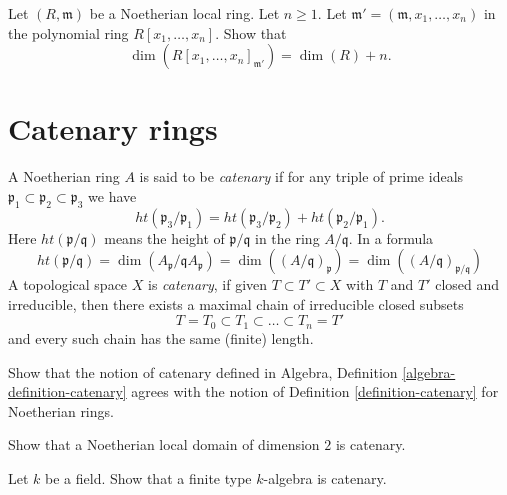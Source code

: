 \begin{exercise}
\label{exercise-dimension-polynomial-ring}
Let $(R, \mathfrak m)$ be a Noetherian local ring.
Let $n \geq 1$. Let $\mathfrak m' = (\mathfrak m, x_1, \ldots, x_n)$
in the polynomial ring $R[x_1, \ldots, x_n]$.
Show that
$$
\dim(R[x_1, \ldots, x_n]_{\mathfrak m'}) = \dim(R) + n.
$$
\end{exercise}





\section{Catenary rings}
\label{section-catenary}

\begin{definition}
\label{definition-catenary}
A Noetherian ring $A$ is said to be {\it catenary}
if for any triple of prime ideals
${\mathfrak p}_1 \subset {\mathfrak p}_2 \subset {\mathfrak p}_3$
we have
$$
ht({\mathfrak p}_3 / {\mathfrak p}_1) = ht({\mathfrak p}_3/{\mathfrak p}_2) +
ht({\mathfrak p}_2/{\mathfrak p}_1).
$$
Here $ht(\mathfrak p/\mathfrak q)$ means the height of
$\mathfrak p/\mathfrak q$ in the ring $A/\mathfrak q$.
In a formula
$$
ht(\mathfrak p/\mathfrak q) =
\dim(A_\mathfrak p/\mathfrak qA_\mathfrak p) =
\dim((A/\mathfrak q)_\mathfrak p) =
\dim((A/\mathfrak q)_{\mathfrak p/\mathfrak q})
$$
A topological space $X$ is {\it catenary}, if given $T \subset T' \subset X$
with $T$ and $T'$ closed and irreducible, then there exists a maximal chain
of irreducible closed subsets
$$
T = T_0 \subset T_1 \subset \ldots \subset T_n = T'
$$
and every such chain has the same (finite) length.
\end{definition}

\begin{exercise}
\label{exercise-catenary-the-same}
Show that the notion of catenary defined in
Algebra, Definition \ref{algebra-definition-catenary}
agrees with the notion of Definition \ref{definition-catenary}
for Noetherian rings.
\end{exercise}

\begin{exercise}
\label{exercise-Noetherian-local-domain-dim-2-catenary}
Show that a Noetherian local domain of dimension $2$ is catenary.
\end{exercise}

\begin{exercise}
\label{exercise-finite-type-over-field-catenary}
Let $k$ be a field.
Show that a finite type $k$-algebra is catenary.
\end{exercise}

